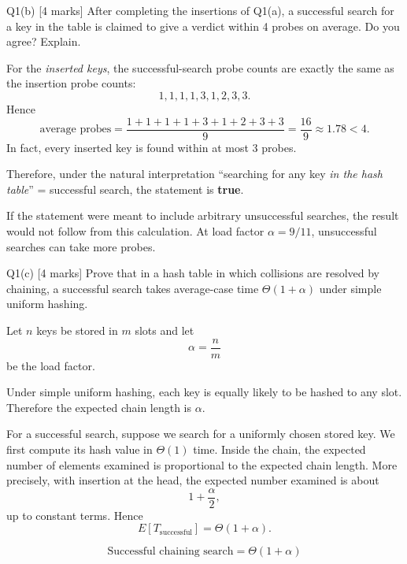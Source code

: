 \documentclass[10.5pt,a4paper]{article}
\begin{document}
\begin{questionbox}{Q1(b) [4 marks]}
After completing the insertions of Q1(a), a successful search for a key in the table is claimed to give a verdict within 4 probes on average. Do you agree? Explain.
\end{questionbox}

\begin{answerbox}
For the \emph{inserted keys}, the successful-search probe counts are exactly the same as the insertion probe counts:
\[
1,1,1,1,3,1,2,3,3.
\]
Hence
\[
\text{average probes}=\frac{1+1+1+1+3+1+2+3+3}{9}
=\frac{16}{9}\approx1.78<4.
\]
In fact, every inserted key is found within at most 3 probes.

Therefore, under the natural interpretation ``searching for any key \emph{in the hash table}'' = successful search, the statement is \textbf{true}.

\begin{examtip}
If the statement were meant to include arbitrary unsuccessful searches, the result would not follow from this calculation. At load factor \(\alpha=9/11\), unsuccessful searches can take more probes.
\end{examtip}
\end{answerbox}

\begin{questionbox}{Q1(c) [4 marks]}
Prove that in a hash table in which collisions are resolved by chaining, a successful search takes average-case time \(\Theta(1+\alpha)\) under simple uniform hashing.
\end{questionbox}

\begin{answerbox}
Let \(n\) keys be stored in \(m\) slots and let
\[
\alpha=\frac{n}{m}
\]
be the load factor.

Under simple uniform hashing, each key is equally likely to be hashed to any slot. Therefore the expected chain length is \(\alpha\).

For a successful search, suppose we search for a uniformly chosen stored key. We first compute its hash value in \(\Theta(1)\) time. Inside the chain, the expected number of elements examined is proportional to the expected chain length. More precisely, with insertion at the head, the expected number examined is about
\[
1+\frac{\alpha}{2},
\]
up to constant terms. Hence
\[
E[T_{\text{successful}}]=\Theta(1+\alpha).
\]

\begin{keybox}
\[
\boxed{\text{Successful chaining search}=\Theta(1+\alpha)}
\]
\end{keybox}
\end{answerbox}
\end{document}
